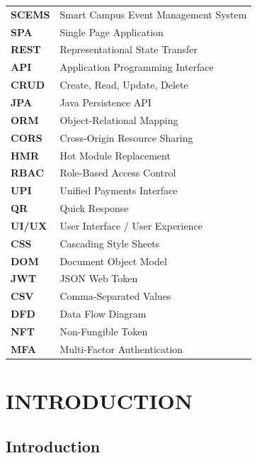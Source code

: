 \documentclass[12pt,a4paper]{report}
\begin{document}
\begin{longtable}{p{3cm} p{10cm}}
\textbf{SCEMS} & Smart Campus Event Management System \\
\textbf{SPA} & Single Page Application \\
\textbf{REST} & Representational State Transfer \\
\textbf{API} & Application Programming Interface \\
\textbf{CRUD} & Create, Read, Update, Delete \\
\textbf{JPA} & Java Persistence API \\
\textbf{ORM} & Object-Relational Mapping \\
\textbf{CORS} & Cross-Origin Resource Sharing \\
\textbf{HMR} & Hot Module Replacement \\
\textbf{RBAC} & Role-Based Access Control \\
\textbf{UPI} & Unified Payments Interface \\
\textbf{QR} & Quick Response \\
\textbf{UI/UX} & User Interface / User Experience \\
\textbf{CSS} & Cascading Style Sheets \\
\textbf{DOM} & Document Object Model \\
\textbf{JWT} & JSON Web Token \\
\textbf{CSV} & Comma-Separated Values \\
\textbf{DFD} & Data Flow Diagram \\
\textbf{NFT} & Non-Fungible Token \\
\textbf{MFA} & Multi-Factor Authentication \\
\end{longtable}

\newpage
\tableofcontents

\chapter{INTRODUCTION}

\section{Introduction}
\linespread{1.5}
\end{document}
